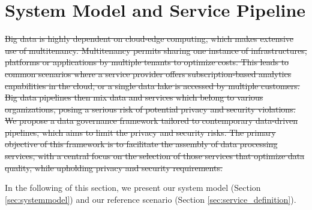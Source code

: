 \section{System Model and Service Pipeline}\label{sec:requirements}
\st{Big data is highly dependent on cloud-edge computing, which makes extensive use of multitenancy.
  Multitenancy permits sharing one instance of infrastructures, platforms or applications by multiple tenants to optimize costs. This leads to common scenarios where a service provider offers subscription-based analytics capabilities in the cloud, or a single data lake is accessed by multiple customers. Big data pipelines then mix data and services which belong to various organizations, posing a serious risk of potential privacy and security violations.
  We propose a data governance framework tailored to contemporary data-driven pipelines, which aims to limit the privacy and security risks. The primary objective of this framework is to facilitate the assembly of data processing services, with a central focus on the selection of those services that optimize data quality, while upholding privacy and security requirements.}

In the following of this section, we present our system model (Section \ref{sec:systemmodel}) and our reference scenario (Section \ref{sec:service_definition}).

